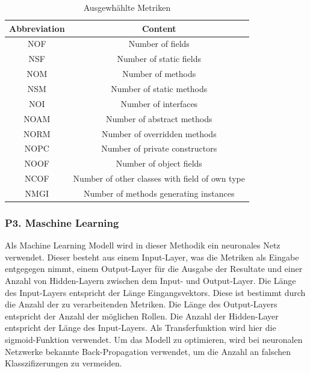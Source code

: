 \documentclass[conference]{IEEEtran}
\begin{document}
\begin{table}[h!]
    \begin{tabular}{ |c|c| }
        \hline
        Abbreviation & Content                                        \\
        \hline
        NOF          & Number of fields                               \\
        \hline
        NSF          & Number of static fields                        \\
        \hline
        NOM          & Number of methods                              \\
        \hline
        NSM          & Number of static methods                       \\
        \hline
        NOI          & Number of interfaces                           \\
        \hline
        NOAM         & Number of abstract methods                     \\
        \hline
        NORM         & Number of overridden methods                   \\
        \hline
        NOPC         & Number of private constructors                 \\
        \hline
        NOOF         & Number of object fields                        \\
        \hline
        NCOF         & Number of other classes with field of own type \\
        \hline
        NMGI         & Number of methods generating instances         \\
        \hline
    \end{tabular}
    \caption{Ausgewhählte Metriken}
    \label{tabel:1}
\end{table}


\subsubsection*{P3. Maschine Learning}

Als Machine Learning Modell wird in dieser Methodik ein neuronales Netz verwendet\cite[p. 5]{dodmetrics}. Dieser besteht aus einem Input-Layer, was die Metriken als Eingabe entgegegen nimmt, einem Output-Layer für die Ausgabe der Resultate und einer Anzahl von Hidden-Layern zwischen dem Input- und Output-Layer.
Die Länge des Input-Layers entspricht der Länge Eingangsvektors. Diese ist bestimmt durch die Anzahl der zu verarbeitenden Metriken. Die Länge des Output-Layers entspricht der Anzahl der möglichen Rollen.
Die Anzahl der Hidden-Layer entspricht der Länge des Input-Layers. Als Transferfunktion wird hier die sigmoid-Funktion verwendet.
Um das Modell zu optimieren, wird bei neuronalen Netzwerke bekannte Back-Propagation verwendet, um die Anzahl an falschen Klasszifizerungen zu vermeiden.
\end{document}
